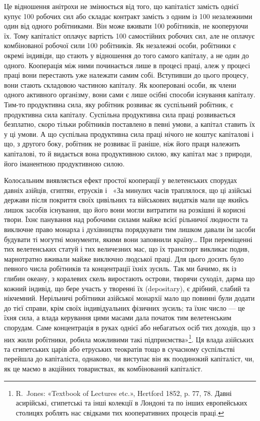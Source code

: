 \parcont{}  %
Це відношення анітрохи не змінюється від того, що капіталіст
замість однієї купує 100 робочих сил або складає контракт замість
з одним із 100 незалежними один від одного робітниками. Він може
вживати 100 робітників, не кооперуючи їх. Тому капіталіст
оплачує вартість 100 самостійних робочих сил, але не оплачує
комбінованої робочої сили 100 робітників. Як незалежні особи,
робітники є окремі індивіди, що стають у відношення до того
самого капіталу, а не один до одного. Кооперація між ними починається
лише в процесі праці, алеж у процесі праці вони перестають
уже належати самим собі. Вступивши до цього процесу,
вони стають складовою частиною капіталу. Як кооперовані
особи, як члени одного активного організму, вони сами є лише
осібні способи існування капіталу. Тим-то продуктивна сила,
яку робітник розвиває як суспільний робітник, є продуктивна
сила капіталу. Суспільна продуктивна сила праці розвивається
безплатно, скоро тільки робітників поставлено в певні умови,
а капітал ставить їх у ці умови. А що суспільна продуктивна
сила праці нічого не коштує капіталові і що, з другого боку, робітник
не розвиває її раніше, ніж його праця належить капіталові,
то й видається вона продуктивною силою, яку капітал має з
природи, його іманентною продуктивною силою.

Колосальним виявляється ефект простої кооперації у велетенських
спорудах давніх азійців, єгиптян, етрусків і~
«За минулих часів траплялося, що ці азійські держави після
покриття своїх цивільних та військових видатків мали ще якийсь
лишок засобів існування, що його вони могли витратити на розкішні
й корисні твори. Їхнє панування над робочими силами майже
всієї рільничої людности та виключне право монарха і духівництва
порядкувати тим лишком давали їм засоби будувати ті
могутні монументи, якими вони заповнили країну\dots{} При переміщенні
тих велетенських статуй і тих величезних мас, що їх
транспорт викликає подив, марнотратно вживали майже виключно
людської праці. Для цього досить було певного числа робітників
та концентрації їхніх зусиль. Так ми бачимо, як із глибин океану,
з коралевих скель виростають острови, творячи суходіл, дарма
що кожний індивід, що бере участь у творенні їх (depositary),
є дрібний, слабий та нікчемний. Нерільничі робітники азійської
монархії мало що повинні були додати до тієї справи, крім
своїх індивідуальних фізичних зусиль; та їхнє число — це їхня
сила, а влада керування цими масами дала початок тим велетенським
спорудам. Саме концентрація в руках однієї або небагатьох
осіб тих доходів, що з них жили робітники, робила можливими
такі підприємства»\footnote{
R.~Jones: «Textbook of Lectures etc.», Hertford 1852, p. 77, 78.
Давні асирійські, єгипетські та інші колекції в Лондоні та по інших
европейських столицях роблять нас свідками тих кооперативних процесів
праці.
}. Ця влада азійських та єгипетських царів
або етруських теократів тощо в сучасному суспільстві перейшла
до капіталіста, однаково, чи виступає він як поодинокий капіталіст,
чи, як це маємо в акційних товариствах, як комбінований
капіталіст.

